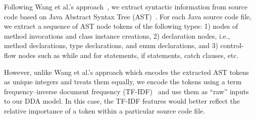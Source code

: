 Following Wang et al.'s approach~\cite{wang2016automatically}, we extract syntactic information from source code based on Java Abstract Syntax Tree (AST)~\cite{neamtiu2005understanding}. For each Java source code file, we extract a sequence of AST node tokens of the following types: 1) nodes of method invocations and class instance creations, 2) declaration nodes, i.e., method declarations, type declarations, and enum declarations, and 3) control-flow nodes such as while and for statements, if statements, catch clauses, etc. 

However, unlike Wang et al.'s approach which encodes the extracted AST tokens as unique integers and treats them equally, we encode the tokens using a term frequency--inverse document frequency (TF-IDF)~\cite{manning2008introduction} and use them as ``raw'' inputs to our DDA model. In this case, the TF-IDF features would better reflect the relative importance of a token within a particular source code file.




